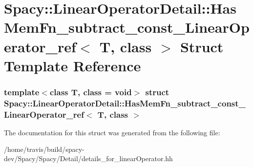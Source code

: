 \hypertarget{structSpacy_1_1LinearOperatorDetail_1_1HasMemFn__subtract__const__LinearOperator__ref}{\section{\-Spacy\-:\-:\-Linear\-Operator\-Detail\-:\-:\-Has\-Mem\-Fn\-\_\-subtract\-\_\-const\-\_\-\-Linear\-Operator\-\_\-ref$<$ \-T, class $>$ \-Struct \-Template \-Reference}
\label{structSpacy_1_1LinearOperatorDetail_1_1HasMemFn__subtract__const__LinearOperator__ref}
}
\subsubsection*{template$<$class T, class = void$>$ struct Spacy\-::\-Linear\-Operator\-Detail\-::\-Has\-Mem\-Fn\-\_\-subtract\-\_\-const\-\_\-\-Linear\-Operator\-\_\-ref$<$ T, class $>$}



\-The documentation for this struct was generated from the following file\-:\begin{DoxyCompactItemize}
\item 
/home/travis/build/spacy-\/dev/\-Spacy/\-Spacy/\-Detail/details\-\_\-for\-\_\-linear\-Operator.\-hh\end{DoxyCompactItemize}
